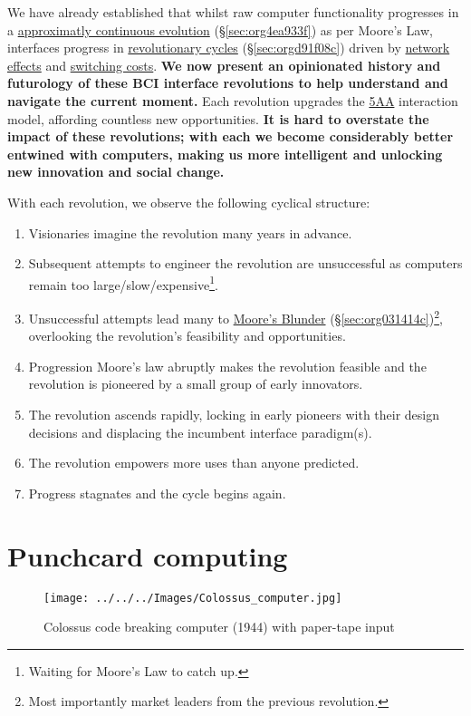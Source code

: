 \documentclass[logo,bsc,singlespacing,parskip]{infthesis}
\begin{document}
We have already established that whilst raw computer functionality progresses in a \hyperref[sec:org4ea933f]{approximatly continuous evolution} (\S \ref{sec:org4ea933f}) as per Moore's Law, interfaces progress in \hyperref[sec:orgd91f08c]{revolutionary cycles} (\S \ref{sec:orgd91f08c}) driven by \hyperref[network effects]{network effects} and \hyperref[switching costs]{switching costs}.
\textbf{We now present an opinionated history and futurology of these BCI interface revolutions to help understand and navigate the current moment.}
Each revolution upgrades the \hyperref[org85f90e8]{5AA} interaction model, affording countless new opportunities.
\textbf{It is hard to overstate the impact of these revolutions; with each we become considerably better entwined with computers, making us more intelligent and unlocking new innovation and social change.}

With each revolution, we observe the following cyclical structure:

\begin{enumerate}
\item Visionaries imagine the revolution many years in advance.
\item Subsequent attempts to engineer the revolution are unsuccessful as computers remain too large/slow/expensive\footnote{Waiting for Moore's Law to catch up.}.
\item Unsuccessful attempts lead many to \hyperref[sec:org031414c]{Moore's Blunder} (\S \ref{sec:org031414c})\footnote{Most importantly market leaders from the previous revolution.}, overlooking the revolution's feasibility and opportunities.
\item Progression Moore's law abruptly makes the revolution feasible and the revolution is pioneered by a small group of early innovators.
\item The revolution ascends rapidly, locking in early pioneers with their design decisions and displacing the incumbent interface paradigm(s).
\item The revolution empowers more uses than anyone predicted.
\item Progress stagnates and the cycle begins again.
\end{enumerate}
\section{Punchcard computing}
\label{sec:org48c78d6}
\begin{wrapfigure}{r}{0.6\textwidth}
\centering
\texttt{[image: ../../../Images/Colossus\_computer.jpg]}
\caption[Colossus code breaking computer (1944)]{Colossus code breaking computer (1944) with paper-tape input}
\end{wrapfigure}
\end{document}
